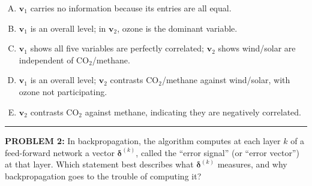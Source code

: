 \documentclass[12pt]{amsart}
\newcommand{\divider}{
  \vspace{-1em} %
  \noindent
  \raisebox{-0.15ex}{\textbullet}%
  \hspace{0.5em}%
  \rule[0.5ex]{0.95\textwidth}{1.0pt}%
  \hspace{0.5em}%
  \raisebox{-0.15ex}{\textbullet}%
  \vspace{0em} %
}
\begin{document}
\begin{enumerate}[(A)]
\item $\mathbf{v}_1$ carries no information because its entries are all equal.
\item $\mathbf{v}_1$ is an overall level; in $\mathbf{v}_2$, ozone is the dominant variable.
\item $\mathbf{v}_1$ shows all five variables are perfectly correlated; $\mathbf{v}_2$ shows wind/solar are independent of $\mathrm{CO}_2$/methane.
\item $\mathbf{v}_1$ is an overall level; $\mathbf{v}_2$ contrasts $\mathrm{CO}_2$/methane against wind/solar, with ozone not participating.
\item $\mathbf{v}_2$ contrasts $\mathrm{CO}_2$ against methane, indicating they are negatively correlated.
\end{enumerate}

%

\divider


{\bf PROBLEM 2:}
In backpropagation, the algorithm computes at each layer $k$ of a feed-forward network a vector $\boldsymbol{\delta}^{(k)}$, called the ``error signal'' (or ``error vector'') at that layer.
% 
Which statement best describes what $\boldsymbol{\delta}^{(k)}$ measures, and why backpropagation goes to the trouble of computing it?
\end{document}
